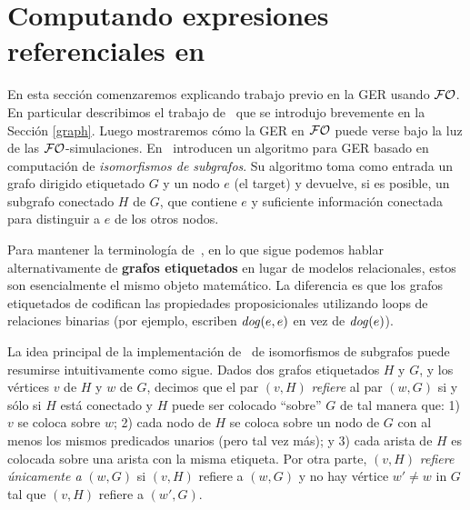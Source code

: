 \section{Computando expresiones referenciales en \FOL}
\label{sec:computandoEnFOL}
En esta secci\'on comenzaremos explicando trabajo previo en la GER usando $\mathcal{FO}$. En particular describimos el trabajo de~\cite{graph} que se introdujo brevemente en la Secci\'on \ref{graph}. Luego mostraremos c\'omo la GER en $\mathcal{FO}$ puede verse bajo la luz de las $\mathcal{FO}$-simulaciones.
En~\cite{graph} introducen un algoritmo para GER basado en computaci\'on de \emph{isomorfismos de subgrafos}. Su algoritmo toma como entrada
un grafo dirigido etiquetado $G$ y un nodo $e$ (el target) y devuelve, si es posible,
un subgrafo conectado $H$  de $G$, que contiene $e$ y suficiente informaci\'on conectada para
distinguir a $e$ de los otros nodos.

Para mantener la terminolog\'ia de~\cite{graph}, en lo que sigue
podemos hablar alternativamente de \textbf{grafos etiquetados} en lugar de modelos relacionales, estos son esencialmente el mismo objeto matem\'atico. La diferencia es que los grafos etiquetados de \cite{graph} codifican las propiedades proposicionales utilizando
loops de relaciones binarias (por ejemplo, escriben $\mathit{dog}(e,e)$ en vez de $\mathit{dog}(e)$).

La idea principal de la implementaci\'on de~\cite{graph} de isomorfismos de subgrafos puede resumirse intuitivamente como sigue.
Dados dos grafos etiquetados $H$ y $G$, y los v\'ertices  $v$ de $H$
y $w$ de $G$, decimos que el par $(v, H)$ {\em refiere}
al par $(w, G)$ si y s\'olo si $H$ est\'a conectado y $H$ puede ser colocado ``sobre'' $G$ de tal manera que: 1) $v$ se coloca sobre $w$; 2) cada
nodo de $H$ se coloca sobre un nodo de $G$ con al menos los mismos
predicados unarios (pero tal vez m\'as); y 3) cada arista de $H$ es
colocada sobre una arista con la misma etiqueta. Por otra parte, $(v, H)$ {\em
refiere \'unicamente a} $(w, G)$ si $(v, H)$ refiere a $(w, G)$ y no hay
v\'ertice $w'\not=w$ in $G$ tal que $(v, H)$ refiere a $(w', G)$.

